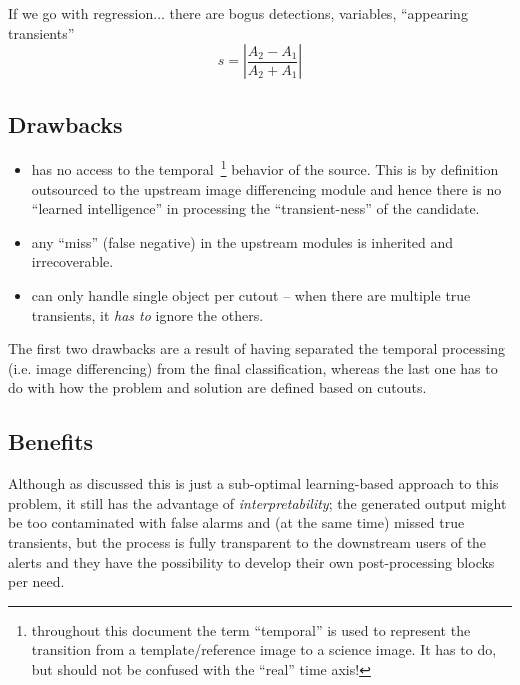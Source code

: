 If we go with regression... there are bogus detections, variables, ``appearing transients''
\begin{equation}
  s=\left| \frac{A_2-A_1}{A_2+A_1} \right|
\end{equation}


\subsection{Drawbacks}
\begin{itemize}
\item has no access to the temporal~\footnote{throughout this document the term ``temporal'' is used to represent the transition from a template/reference image to a science image. It has to do, but should not be confused with the ``real'' time axis!} behavior of the source. This is by definition outsourced to the upstream image differencing module and hence there is no ``learned intelligence'' in processing the ``transient-ness'' of the candidate.
\item any ``miss'' (false negative) in the upstream modules is inherited and irrecoverable.
\item can only handle single object per cutout -- when there are multiple true transients, it \emph{has to} ignore the others.
\end{itemize}

The first two drawbacks are a result of having separated the temporal processing (i.e. image differencing) from the final classification, whereas the last one has to do with how the problem and solution are defined based on cutouts.



\subsection{Benefits}
\label{sec:rb_benefits}

Although as discussed this is just a sub-optimal learning-based approach to this problem, it still has the advantage of \emph{interpretability}; the generated output might be too contaminated with false alarms and (at the same time) missed true transients, but the process is fully transparent to the downstream users of the alerts and they have the possibility to develop their own post-processing blocks per need.


